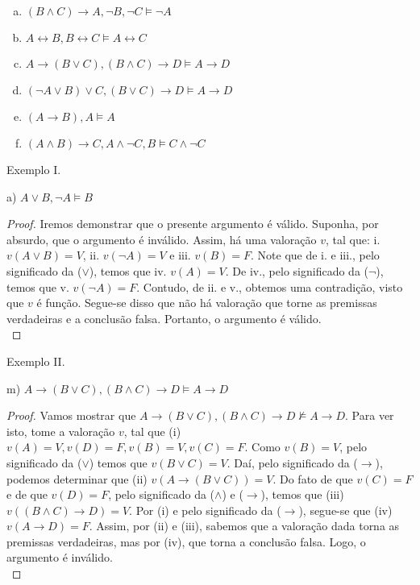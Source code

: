 \documentclass[12pt]{exam}
\begin{document}
\begin{questions}
\begin{multicols}{2}
\begin{enumerate}[(a)]
    \item
     $(B\land C) \rightarrow A, \neg B, \neg C\vDash \neg A$

    \item
     $A \leftrightarrow B, B\leftrightarrow C\vDash A\leftrightarrow C$

    \item
     $A \rightarrow (B\lor C), (B\land C)\rightarrow D\vDash A\rightarrow D$

    \item
     $(\neg A \lor B)\lor C, (B\lor C)\rightarrow D\vDash A\rightarrow D$

    \item
     $(A\rightarrow B), A\vDash A$

    \item
     $(A\land B)\rightarrow C, A\land \neg C, B\vDash C\land \neg C$


  \end{enumerate}
\end{multicols}



\end{questions}

Exemplo I.

\bigskip

a) $A \lor B, \neg A \vDash B$

\begin{proof}
Iremos demonstrar que o presente argumento é válido. Suponha, por absurdo, que o argumento é inválido. Assim, há uma valoração $v$, tal que:
i. $v(A\lor B)=V$, 
ii. $v(\neg A)=V$ e 
iii. $v(B)=F$. Note que de i. e iii., pelo significado da ($\lor$), temos que iv. $v(A)=V$. De iv., pelo significado da ($\neg$), temos que v. $v(\neg A)=F$. Contudo, de ii. e v., obtemos uma contradição, visto que $v$ é função. Segue-se disso que não há valoração que torne as premissas verdadeiras e a conclusão falsa. Portanto, o argumento é válido.\\
\end{proof}

Exemplo II.

\bigskip

m) $A \rightarrow (B\lor C), (B\land C)\rightarrow D\vDash A\rightarrow D$

\begin{proof}
Vamos mostrar que $A \rightarrow (B\lor C), (B\land C)\rightarrow D\nvDash A\rightarrow D$. Para ver isto, tome a valoração $v$, tal que 
(i) $v(A)=V, v(D)=F, v(B)=V, v(C)=F $. Como $v(B)=V$, pelo significado da ($\lor$) temos que $v(B\lor C)=V$. Daí, pelo significado da ($\to$), podemos determinar que (ii) $v(A\to (B\lor C))=V$. Do fato de que $v(C)=F$ e de que $v(D)=F$, pelo significado da ($\land$) e ($\to$), temos que (iii) $v((B\land C)\to D)=V$. Por (i) e pelo significado da ($\to$), segue-se que (iv) $v(A\to D)=F$. Assim, por (ii) e (iii), sabemos que a valoração dada torna as premissas verdadeiras, mas por (iv), que torna a conclusão falsa. Logo, o argumento é inválido.\\
\end{proof}
\end{document}
